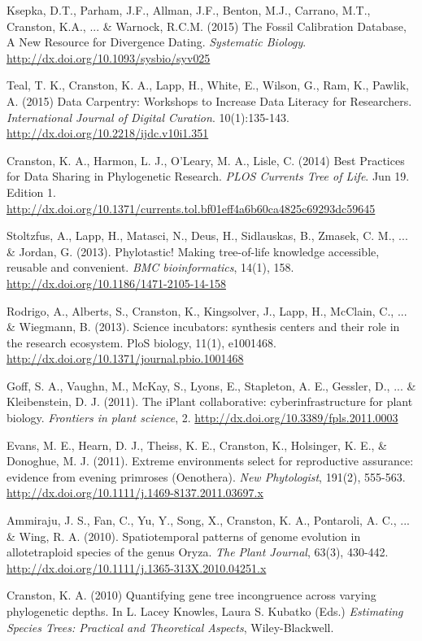 \documentclass[10pt]{article}
\begin{document}
Ksepka, D.T., Parham, J.F., Allman, J.F., Benton, M.J., Carrano, M.T., Cranston, K.A., ... \& Warnock, R.C.M. (2015) The Fossil Calibration Database, A New Resource for Divergence Dating. \textit{Systematic Biology}. \url{http://dx.doi.org/10.1093/sysbio/syv025}

Teal, T. K., Cranston, K. A., Lapp, H., White, E., Wilson, G., Ram, K., Pawlik, A. (2015) Data Carpentry: Workshops to Increase Data Literacy for Researchers. \textit{International Journal of Digital Curation}. 10(1):135-143. \url{http://dx.doi.org/10.2218/ijdc.v10i1.351}
 
Cranston, K. A., Harmon, L. J., O'Leary, M. A., Lisle, C. (2014) Best Practices for Data Sharing in Phylogenetic Research. \textit{PLOS Currents Tree of Life}. Jun 19. Edition 1. \url{http://dx.doi.org/10.1371/currents.tol.bf01eff4a6b60ca4825c69293dc59645} 

Stoltzfus, A., Lapp, H., Matasci, N., Deus, H., Sidlauskas, B., Zmasek, C. M., ... \& Jordan, G. (2013). Phylotastic! Making tree-of-life knowledge accessible, reusable and convenient. \textit{BMC bioinformatics}, 14(1), 158. \url{http://dx.doi.org/10.1186/1471-2105-14-158} 

Rodrigo, A., Alberts, S., Cranston, K., Kingsolver, J., Lapp, H., McClain, C., ... \& Wiegmann, B. (2013). Science incubators: synthesis centers and their role in the research ecosystem. PloS biology, 11(1), e1001468. \url{http://dx.doi.org/10.1371/journal.pbio.1001468} 

Goff, S. A., Vaughn, M., McKay, S., Lyons, E., Stapleton, A. E., Gessler, D., ... \& Kleibenstein, D. J. (2011). The iPlant collaborative: cyberinfrastructure for plant biology. \textit{Frontiers in plant science}, 2. \url{http://dx.doi.org/10.3389/fpls.2011.0003} 

Evans, M. E., Hearn, D. J., Theiss, K. E., Cranston, K., Holsinger, K. E., \& Donoghue, M. J. (2011). Extreme environments select for reproductive assurance: evidence from evening primroses (Oenothera). \textit{New Phytologist}, 191(2), 555-563. \url{http://dx.doi.org/10.1111/j.1469-8137.2011.03697.x} 

Ammiraju, J. S., Fan, C., Yu, Y., Song, X., Cranston, K. A., Pontaroli, A. C., ... \& Wing, R. A. (2010). Spatiotemporal patterns of genome evolution in allotetraploid species of the genus Oryza. \textit{The Plant Journal}, 63(3), 430-442. \url{http://dx.doi.org/10.1111/j.1365-313X.2010.04251.x} 

Cranston, K. A. (2010) Quantifying gene tree incongruence across varying phylogenetic depths. In L. Lacey Knowles, Laura S. Kubatko (Eds.) \textit{Estimating Species Trees: Practical and Theoretical Aspects}, Wiley-Blackwell.
\end{document}
